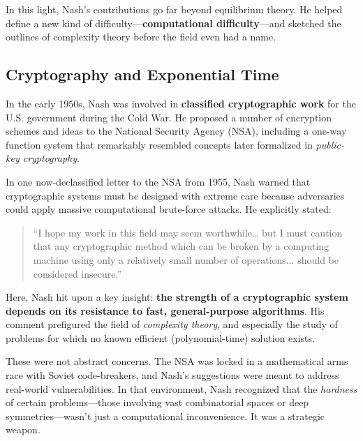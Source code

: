 In this light, Nash’s contributions go far beyond equilibrium theory. He helped define a new kind of difficulty—\textbf{computational difficulty}—and sketched the outlines of complexity theory before the field even had a name.

\subsection{Cryptography and Exponential Time}

In the early 1950s, Nash was involved in \textbf{classified cryptographic work} for the U.S. government during the Cold War. He proposed a number of encryption schemes and ideas to the National Security Agency (NSA), including a one-way function system that remarkably resembled concepts later formalized in \textit{public-key cryptography}.

In one now-declassified letter to the NSA from 1955, Nash warned that cryptographic systems must be designed with extreme care because adversaries could apply massive computational brute-force attacks. He explicitly stated:

\begin{quote}
``I hope my work in this field may seem worthwhile… but I must caution that any cryptographic method which can be broken by a computing machine using only a relatively small number of operations... should be considered insecure.''
\end{quote}

Here, Nash hit upon a key insight: \textbf{the strength of a cryptographic system depends on its resistance to fast, general-purpose algorithms}. His comment prefigured the field of \textit{complexity theory}, and especially the study of problems for which no known efficient (polynomial-time) solution exists.

These were not abstract concerns. The NSA was locked in a mathematical arms race with Soviet code-breakers, and Nash's suggestions were meant to address real-world vulnerabilities. In that environment, Nash recognized that the \textit{hardness} of certain problems—those involving vast combinatorial spaces or deep symmetries—wasn’t just a computational inconvenience. It was a strategic weapon.

